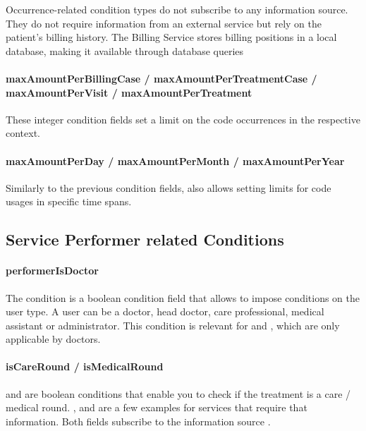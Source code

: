 Occurrence-related condition types do not subscribe to any information source.
They do not require information from an external service but rely on the patient's billing history.
The Billing Service stores billing positions in a local database, making it available through database queries


\paragraph{maxAmountPerBillingCase / maxAmountPerTreatmentCase / maxAmountPerVisit / maxAmountPerTreatment}
These integer condition fields set a limit on the code occurrences in the respective context.

\paragraph{maxAmountPerDay / maxAmountPerMonth / maxAmountPerYear}
Similarly to the previous condition fields, \RL also allows setting limits for code usages in specific time spans.

\subsection{Service Performer related Conditions}\label{subsec:service-performer-related-conditions}

\paragraph{performerIsDoctor}
The  condition is a boolean condition field that allows to impose conditions on the user type.
A user can be a doctor, head doctor, care professional, medical assistant or administrator.
This condition is relevant for  and , which are only applicable by doctors.

\paragraph{isCareRound / isMedicalRound}
 and  are boolean conditions that enable you to check if the treatment is a care / medical round.
,  and  are a few examples for services that require that information.
Both fields subscribe to the information source .




